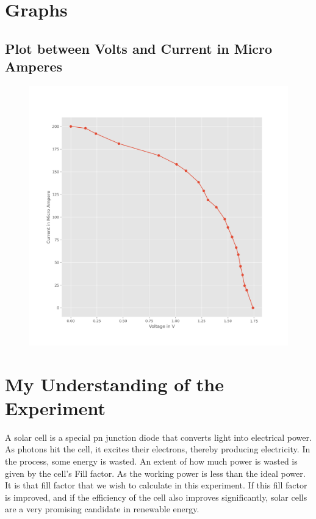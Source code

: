 \documentclass[12pt]{article}
\begin{document}
\section{Graphs}
\subsection{Plot between Volts and Current in Micro Amperes}
\begin{figure}[H]
	\centering
	\includegraphics[scale=0.6]{fig.png}
	\label{it}
\end{figure}


\section{My Understanding of the Experiment}
A solar cell is a special pn junction diode that converts light into electrical power. As photons hit the cell, it excites their electrons, thereby producing electricity.
In the process, some energy is wasted. An extent of how much power is wasted is given by the cell's Fill factor. As the working power is less than the ideal power. 
It is that fill factor that we wish to calculate in this experiment. If this fill factor is improved, and if the efficiency of the cell also improves significantly, solar cells are a very promising candidate in renewable energy. 
\end{document}
